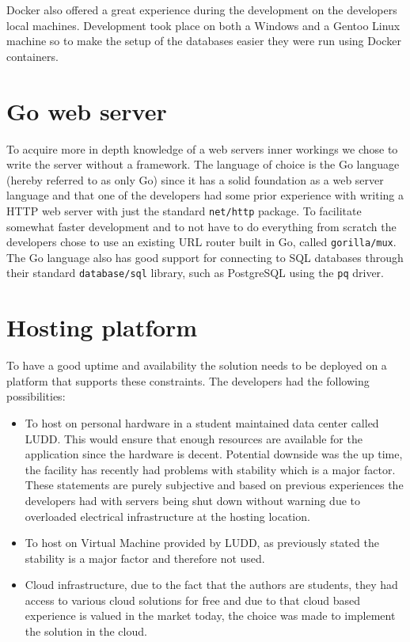 \documentclass[12pt,a4paper]{report}
\begin{document}
Docker also offered a great experience during the development on the developers local machines. Development took place on both a Windows and a Gentoo Linux machine so to make the setup of the databases easier they were run using Docker containers.

\section{Go web server}
To acquire more in depth knowledge of a web servers inner workings we chose to write the server without a framework. The language of choice is the Go language (hereby referred to as only Go) since it has a solid foundation as a web server language and that one of the developers had some prior experience with writing a HTTP web server with just the standard \texttt{net/http} package. To facilitate somewhat faster development and to not have to do everything from scratch the developers chose to use an existing URL router built in Go, called \texttt{gorilla/mux}.
The Go language also has good support for connecting to SQL databases through their standard \texttt{database/sql} library, such as PostgreSQL using the \texttt{pq} driver\cite{https://github.com/lib/pq}.

\section{Hosting platform}
To have a good uptime and availability the solution needs to be deployed on a platform that supports these constraints. The developers had the following possibilities:

\begin{itemize}
    \item To host on personal hardware in a student maintained data center called LUDD. This would ensure that enough resources are available for the application since the hardware is decent. Potential downside was the up time, the facility has recently had problems with stability which is a major factor. These statements are purely subjective and based on previous experiences the developers had with servers being shut down without warning due to overloaded electrical infrastructure at the hosting location.
    \item To host on Virtual Machine provided by LUDD, as previously stated the stability is a major factor and therefore not used.
    \item Cloud infrastructure, due to the fact that the authors are students, they had access to various cloud solutions for free and due to that cloud based experience is valued in the market today, the choice was made to implement the solution in the cloud.
\end{itemize}
\end{document}
